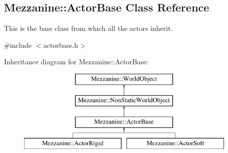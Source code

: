 \hypertarget{classMezzanine_1_1ActorBase}{
\subsection{Mezzanine::ActorBase Class Reference}
\label{classMezzanine_1_1ActorBase}
}


This is the base class from which all the actors inherit.  




{\ttfamily \#include $<$actorbase.h$>$}

Inheritance diagram for Mezzanine::ActorBase:\begin{figure}[H]
\begin{center}
\leavevmode
\includegraphics[height=4.000000cm]{classMezzanine_1_1ActorBase}
\end{center}
\end{figure}
